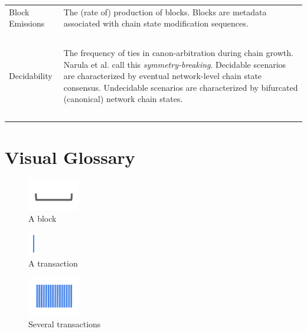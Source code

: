 \documentclass[11pt]{article}
\theoremstyle{plain}
\begin{document}
\begin{table}[H]
{\begin{tabular}{|p{5cm}|p{9cm}|}
Block Emissions &
The (rate of) production of blocks. Blocks are metadata associated with chain state modification sequences.
\\~\\

Decidability &
The frequency of ties in canon-arbitration during chain growth.
Narula et al. call this \emph{symmetry-breaking}.
Decidable scenarios are characterized by eventual network-level chain state consensus.
Undecidable scenarios are characterized by bifurcated (canonical) network chain states.
\\~\\

\hline
\end{tabular}
}
\end{table}



\pagebreak
\section{\normalsize{Visual Glossary}}\label{sec: visual-glossary}

\begin{figure}[tph]
    \centering
    \includegraphics[width=0.2\textwidth]{imgs/vis_block.png}
    \caption{A block}
    \label{fig:block}
\end{figure}

\begin{figure}[tph]
    \centering
    \includegraphics[height=1cm]{imgs/vis_tx.png}
    \caption{A transaction}
    \label{fig:tx}
\end{figure}

\begin{figure}[tph]
    \centering
    \includegraphics[width=0.2\textwidth]{imgs/vis_tx_set.png}
    \caption{Several transactions}
    \label{fig:txs}
\end{figure}
\end{document}
